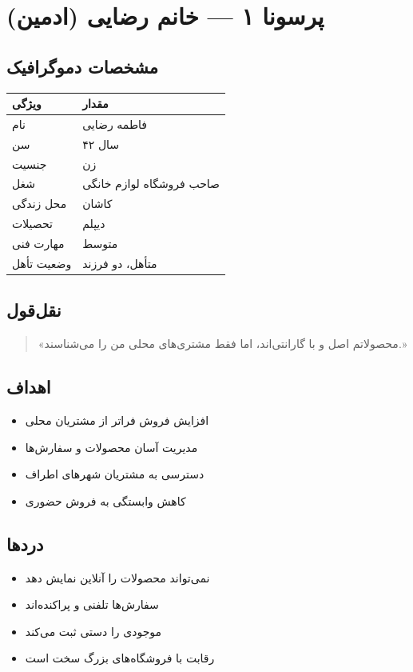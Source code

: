 \documentclass[12pt, a4paper]{article}
\begin{document}
\section{پرسونا ۱ — خانم رضایی (ادمین)}

\subsection{مشخصات دموگرافیک}
\begin{center}
\begin{tabular}{|l|l|}
\hline
\textbf{ویژگی} & \textbf{مقدار} \\
\hline
نام & فاطمه رضایی \\
\hline
سن & ۴۲ سال \\
\hline
جنسیت & زن \\
\hline
شغل & صاحب فروشگاه لوازم خانگی \\
\hline
محل زندگی & کاشان \\
\hline
تحصیلات & دیپلم \\
\hline
مهارت فنی & متوسط \\
\hline
وضعیت تأهل & متأهل، دو فرزند \\
\hline
\end{tabular}
\end{center}

\subsection{نقل‌قول}
\begin{quote}
«محصولاتم اصل و با گارانتی‌اند، اما فقط مشتری‌های محلی من را می‌شناسند.»
\end{quote}

\subsection{اهداف}
\begin{itemize}
    \item افزایش فروش فراتر از مشتریان محلی
    \item مدیریت آسان محصولات و سفارش‌ها
    \item دسترسی به مشتریان شهرهای اطراف
    \item کاهش وابستگی به فروش حضوری
\end{itemize}

\subsection{دردها}
\begin{itemize}
    \item نمی‌تواند محصولات را آنلاین نمایش دهد
    \item سفارش‌ها تلفنی و پراکنده‌اند
    \item موجودی را دستی ثبت می‌کند
    \item رقابت با فروشگاه‌های بزرگ سخت است
\end{itemize}
\end{document}

